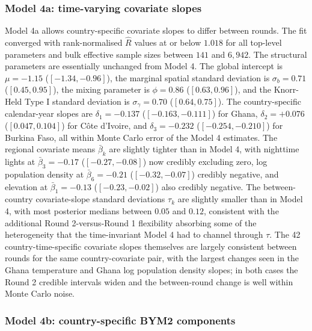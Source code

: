 \documentclass{article}
\begin{document}
\subsubsection{Model 4a: time-varying covariate
slopes}\label{model-4a-time-varying-covariate-slopes}

Model 4a allows country-specific covariate slopes to differ between
rounds. The fit converged with rank-normalised \(\hat{R}\) values at or
below \(1.018\) for all top-level parameters and bulk effective sample
sizes between \(141\) and \(6,942\). The structural parameters are
essentially unchanged from Model 4. The global intercept is
\(\mu = -1.15\) (\([-1.34, -0.96]\)), the marginal spatial standard
deviation is \(\sigma_b = 0.71\) (\([0.45, 0.95]\)), the mixing
parameter is \(\phi = 0.86\) (\([0.63, 0.96]\)), and the Knorr-Held Type
I standard deviation is \(\sigma_\gamma = 0.70\) (\([0.64, 0.75]\)). The
country-specific calendar-year slopes are \(\delta_1 = -0.137\)
(\([-0.163, -0.111]\)) for Ghana, \(\delta_2 = +0.076\)
(\([0.047, 0.104]\)) for Côte d'Ivoire, and \(\delta_3 = -0.232\)
(\([-0.254, -0.210]\)) for Burkina Faso, all within Monte Carlo error of
the Model 4 estimates. The regional covariate means \(\bar{\beta}_k\)
are slightly tighter than in Model 4, with nighttime lights at
\(\bar{\beta}_3 = -0.17\) (\([-0.27, -0.08]\)) now credibly excluding
zero, log population density at \(\bar{\beta}_6 = -0.21\)
(\([-0.32, -0.07]\)) credibly negative, and elevation at
\(\bar{\beta}_1 = -0.13\) (\([-0.23, -0.02]\)) also credibly negative.
The between-country covariate-slope standard deviations \(\tau_k\) are
slightly smaller than in Model 4, with most posterior medians between
\(0.05\) and \(0.12\), consistent with the additional Round
2-versus-Round 1 flexibility absorbing some of the heterogeneity that
the time-invariant Model 4 had to channel through \(\tau\). The 42
country-time-specific covariate slopes themselves are largely consistent
between rounds for the same country-covariate pair, with the largest
changes seen in the Ghana temperature and Ghana log population density
slopes; in both cases the Round 2 credible intervals widen and the
between-round change is well within Monte Carlo noise.

\subsubsection{Model 4b: country-specific BYM2
components}\label{model-4b-country-specific-bym2-components}
\end{document}
